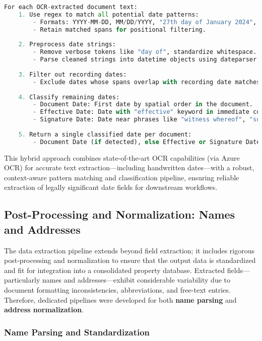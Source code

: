 \documentclass{article}
\begin{document}
\begin{lstlisting}[language=Python, caption={Pseudocode for Date Extraction and Classification}]
For each OCR-extracted document text:
    1. Use regex to match all potential date patterns:
        - Formats: YYYY-MM-DD, MM/DD/YYYY, "27th day of January 2024", etc.
        - Retain matched spans for positional filtering.
    
    2. Preprocess date strings:
        - Remove verbose tokens like "day of", standardize whitespace.
        - Parse cleaned strings into datetime objects using dateparser.
    
    3. Filter out recording dates:
        - Exclude dates whose spans overlap with recording date matches.
    
    4. Classify remaining dates:
        - Document Date: First date by spatial order in the document.
        - Effective Date: Date with "effective" keyword in immediate context.
        - Signature Date: Date near phrases like "witness whereof", "subscribed and sworn".
    
    5. Return a single classified date per document:
        - Document Date (if detected), else Effective or Signature Date.
\end{lstlisting}

This hybrid approach combines state-of-the-art OCR capabilities (via Azure OCR) for accurate text extraction—including handwritten dates—with a robust, context-aware pattern matching and classification pipeline, ensuring reliable extraction of legally significant date fields for downstream workflows.

\subsection{Post-Processing and Normalization: Names and Addresses}

The data extraction pipeline extends beyond field extraction; it includes rigorous post-processing and normalization to ensure that the output data is standardized and fit for integration into a consolidated property database. Extracted fields—particularly names and addresses—exhibit considerable variability due to document formatting inconsistencies, abbreviations, and free-text entries. Therefore, dedicated pipelines were developed for both \textbf{name parsing} and \textbf{address normalization}.

\subsubsection{Name Parsing and Standardization}
\end{document}
